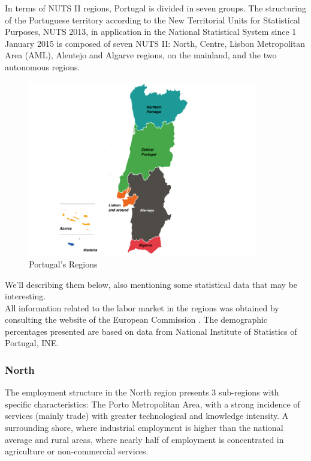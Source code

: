In terms of NUTS II regions, Portugal is divided in seven groups.
The structuring of the Portuguese territory according to the New Territorial Units for Statistical Purposes, NUTS 2013,  in application in the National Statistical System since 1 January 2015 is composed of seven NUTS II: North, Centre, Lisbon Metropolitan Area (AML), Alentejo and Algarve regions, on the mainland, and the two autonomous regions. \cite{INEE}
\begin{figure}[h]
\centering %
\includegraphics[width=10cm]{images/portugal.png} 

\caption{Portugal's Regions}
\label{figura:qualquernome}
\end{figure}

We'll describing them below, also mentioning some statistical data that may be interesting. \\
All information related to the labor market in the regions was obtained by consulting the  website of the European Commission \cite{trab}. The demographic percentages presented are based on data from  National Institute of Statistics of Portugal, INE. 

\subsubsection{North}
The employment structure in the North region presents 3 sub-regions with specific characteristics: 
The Porto Metropolitan Area, with a strong incidence of services (mainly trade) with greater technological and knowledge intensity. A surrounding shore, where industrial employment is  higher than the national average and rural areas, where nearly half of employment is concentrated in agriculture or non-commercial services.

